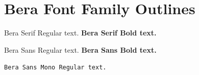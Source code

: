 \documentclass{article}
\begin{document}
\section{Bera Font Family Outlines}

Bera Serif Regular text.
\textbf{Bera Serif Bold text.}

\textsf{Bera Sans Regular text. \textbf{Bera Sans Bold text.}}

\texttt{Bera Sans Mono Regular text.}
\end{document}
